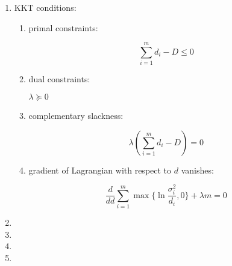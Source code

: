 \documentclass[11pt, letterpaper, titlepage]{article}
\begin{document}
\begin{enumerate}
\begin{enumerate}
        \item %
        
        KKT conditions:
        
        \begin{enumerate}
            
            \item primal constraints: 
            
            \begin{equation*}
                \sum_{i = 1}^{m} d_i - D \leq 0
            \end{equation*}
            
            \item dual constraints: 
            
            $\lambda \succeq 0$
            
            \item complementary slackness: 
            
            \begin{equation*}
                \lambda (\sum_{i = 1}^{m} d_i - D) = 0 
            \end{equation*}
            
            \item gradient of Lagrangian with respect to $d$ vanishes:
            
            \begin{equation*}
                \frac{d}{d d} \sum_{i = 1}^{m} \max \{\ln \frac{\sigma_i^2}{d_i}, 0\} + \lambda m = 0
            \end{equation*}
            
        \end{enumerate}
        
        \item
        
        \item
        
        \item
        
        \item
        
    \end{enumerate}
    
\end{enumerate}
\end{document}
